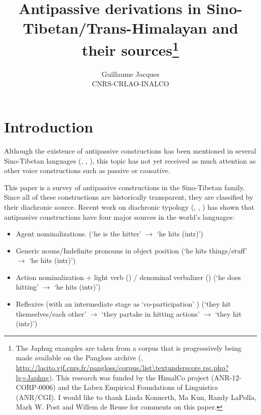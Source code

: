\documentclass[oneside,a4paper,11pt]{article}
\begin{document}
 
\title{Antipassive derivations in Sino-Tibetan/Trans-Himalayan and their sources\footnote{The Japhug examples are taken from a corpus that is progressively being made available on the Pangloss archive (\citealt{michailovsky14pangloss},  
 \url{http://lacito.vjf.cnrs.fr/pangloss/corpus/list\textunderscore rsc.php?lg=Japhug}). This research was funded by the HimalCo project (ANR-12-CORP-0006) and  the Labex Empirical Foundations of Linguistics (ANR/CGI). I would like to thank Linda Konnerth, Ma Kun, Randy LaPolla, Mark W. Post and Willem de Reuse for comments on this paper.}}
\author{Guillaume Jacques\\ CNRS-CRLAO-INALCO}
\maketitle

\sloppy

\section*{Introduction}
Although the existence of antipassive constructions has been mentioned in several Sino-Tibetan languages (\citealt[225-7]{doornenbal09}, \citealt{jacques14antipassive}, \citealt{bickel15antipassive}), this topic has not yet received as much attention as other voice constructions such as passive or causative.

This paper is a survey of antipassive constructions in the Sino-Tibetan family. Since all of these constructions are historically transparent, they are classified by their diachronic source. Recent work on diachronic typology (\citealt[235]{janic.these},  \citealt{jacques14antipassive}, \citealt{sanso17antipassive}) has shown that antipassive constructions have four major sources in the world's languages:
\begin{itemize}
\item Agent nominalizations. (`he is the hitter' $\rightarrow$  `he hits (intr)')
\item Generic nouns/Indefinite pronouns in object position  (`he hits things/stuff' $\rightarrow$  `he hits (intr)')
\item Action nominalization + light verb (\citealt{creissels12antip}) / denominal verbalizer (\citealt{jacques14antipassive}) (`he does hitting' $\rightarrow$  `he hits (intr)')
\item Reflexive (with an intermediate stage as `co-participation' \citealt{creissels08coparticipation}) (`they hit themselves/each other' $\rightarrow$  `they partake in hitting actions' $\rightarrow$  `they hit (intr)')
\end{itemize}
\end{document}
